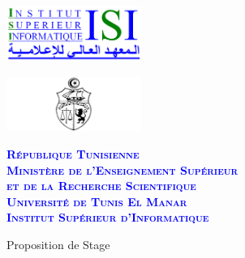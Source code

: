 \documentclass{article}
\begin{document}
\pagestyle{fancy}
\renewcommand{\footrulewidth}{0.4pt}
\renewcommand{\headrulewidth}{0.0pt}
\renewcommand{\baselinestretch}{1}
\lhead{}
\rhead{}

\noindent\begin{Form}
\begin{center}
\begin{minipage}[c]{58mm}
\begin{center}
\includegraphics[width=44mm]{LogoISI}
\end{center}
\end{minipage}
\begin{minipage}[c]{58mm}
\begin{center}
\includegraphics[width=44mm]{Tn2}
\end{center}
\end{minipage}
\begin{minipage}[c]{58mm}
\begin{center}
\textcolor{blue}{
	\footnotesize{
			\textbf{ 
			\textsc{République Tunisienne\\
			Ministère de l'Enseignement Supérieur\\
			et de la Recherche Scientifique\\
			Université de Tunis El Manar\\
			Institut Supérieur d'Informatique\\
			}
		}
	}
}
\end{center}
\end{minipage}
\end{center}

\vspace*{7mm}

\begin{center}
 \huge{Proposition de Stage}
 \end{center}


\end{Form}
\end{document}
